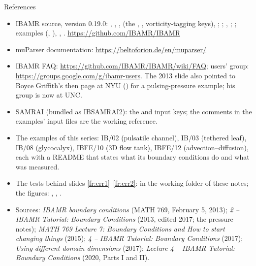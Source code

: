 \documentclass[aspectratio=169,11pt]{beamer}
\begin{document}
\begin{frame}{References}
\label{fr:refs}
\scriptsize
\begin{itemize}
  \item IBAMR source, version 0.19.0: , , ,  (the , , vorticity-tagging keys), ; ; , ; ; examples  (, ), , . \url{https://github.com/IBAMR/IBAMR}
  \item muParser documentation: \url{https://beltoforion.de/en/muparser/}
  \item IBAMR FAQ: \url{https://github.com/IBAMR/IBAMR/wiki/FAQ}; users' group: \url{https://groups.google.com/g/ibamr-users}. The 2013 slide also pointed to Boyce Griffith's then page at NYU () for a pulsing-pressure example; his group is now at UNC.
  \item SAMRAI (bundled as IBSAMRAI2): the  and  input keys; the comments in the examples' input files are the working reference.
  \item The examples of this series: IB/02 (pulsatile channel), IB/03 (tethered leaf), IB/08 (glycocalyx), IBFE/10 (3D flow tank), IBFE/12 (advection--diffusion), each with a README that states what its boundary conditions do and what was measured.
  \item The tests behind slides \ref{fr:err1}--\ref{fr:err2}:  in the working folder of these notes; the figures: , , .
  \item Sources: \emph{IBAMR boundary conditions} (MATH 769, February 5, 2013); \emph{2 -- IBAMR Tutorial: Boundary Conditions} (2013, edited 2017; the pressure notes); \emph{MATH 769 Lecture 7: Boundary Conditions and How to start changing things} (2015); \emph{4 -- IBAMR Tutorial: Boundary Conditions} (2017); \emph{Using different domain dimensions} (2017); \emph{Lecture 4 -- IBAMR Tutorial: Boundary Conditions} (2020, Parts I and II).
\end{itemize}
\end{frame}
\end{document}
